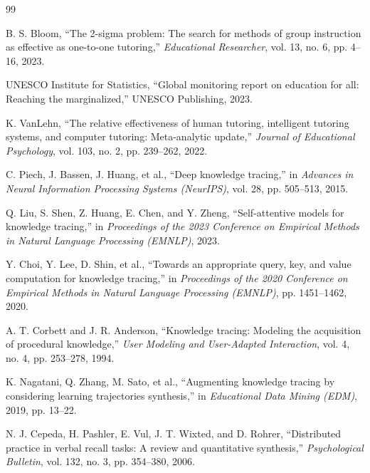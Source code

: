 \documentclass[10pt,twocolumn]{article}
\begin{document}
\begin{thebibliography}{99}

 B. S. Bloom, ``The 2-sigma problem: The search for methods of group instruction as effective as one-to-one tutoring,'' \textit{Educational Researcher}, vol. 13, no. 6, pp. 4--16, 2023.

 UNESCO Institute for Statistics, ``Global monitoring report on education for all: Reaching the marginalized,'' UNESCO Publishing, 2023.

 K. VanLehn, ``The relative effectiveness of human tutoring, intelligent tutoring systems, and computer tutoring: Meta-analytic update,'' \textit{Journal of Educational Psychology}, vol. 103, no. 2, pp. 239--262, 2022.

 C. Piech, J. Bassen, J. Huang, et al., ``Deep knowledge tracing,'' in \textit{Advances in Neural Information Processing Systems (NeurIPS)}, vol. 28, pp. 505--513, 2015.

 Q. Liu, S. Shen, Z. Huang, E. Chen, and Y. Zheng, ``Self-attentive models for knowledge tracing,'' in \textit{Proceedings of the 2023 Conference on Empirical Methods in Natural Language Processing (EMNLP)}, 2023.

 Y. Choi, Y. Lee, D. Shin, et al., ``Towards an appropriate query, key, and value computation for knowledge tracing,'' in \textit{Proceedings of the 2020 Conference on Empirical Methods in Natural Language Processing (EMNLP)}, pp. 1451--1462, 2020.

 A. T. Corbett and J. R. Anderson, ``Knowledge tracing: Modeling the acquisition of procedural knowledge,'' \textit{User Modeling and User-Adapted Interaction}, vol. 4, no. 4, pp. 253--278, 1994.

 K. Nagatani, Q. Zhang, M. Sato, et al., ``Augmenting knowledge tracing by considering learning trajectories synthesis,'' in \textit{Educational Data Mining (EDM)}, 2019, pp. 13--22.

 N. J. Cepeda, H. Pashler, E. Vul, J. T. Wixted, and D. Rohrer, ``Distributed practice in verbal recall tasks: A review and quantitative synthesis,'' \textit{Psychological Bulletin}, vol. 132, no. 3, pp. 354--380, 2006.

\end{thebibliography}
\end{document}
